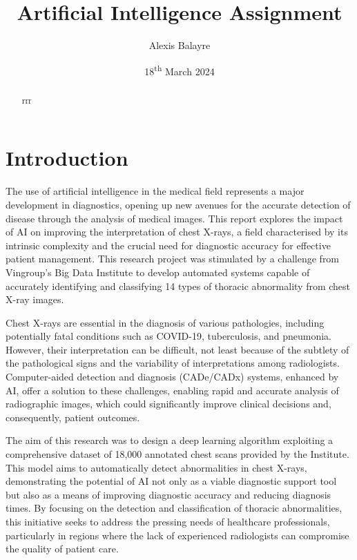 \documentclass[12pt,oneside]{book} %
\title{Artificial Intelligence Assignment}
\author{Alexis Balayre}
\date{18\textsuperscript{th} March 2024}
\begin{document}
\frontmatter

\maketitle

\begin{abstract}

    rrr

\end{abstract}

{
\clearpage
\singlespacing
{
    \tableofcontents
}
\clearpage

\listoffigures

\listoftables
}

\mainmatter
\pagestyle{fancy}
\fancyhead[L]{\nouppercase{\leftmark}}
\fancyhead[R]{\nouppercase{\rightmark}}

\chapter{Introduction}
The use of artificial intelligence in the medical field represents a major
development in diagnostics, opening up new avenues for the accurate detection
of disease through the analysis of medical images. This report explores the
impact of AI on improving the interpretation of chest X-rays, a field
characterised by its intrinsic complexity and the crucial need for diagnostic
accuracy for effective patient management. This research project was stimulated
by a challenge from Vingroup's Big Data Institute to develop automated systems
capable of accurately identifying and classifying 14 types of thoracic
abnormality from chest X-ray images.

Chest X-rays are essential in the diagnosis of various pathologies, including
potentially fatal conditions such as COVID-19, tuberculosis, and pneumonia.
However, their interpretation can be difficult, not least because of the
subtlety of the pathological signs and the variability of interpretations among
radiologists. Computer-aided detection and diagnosis (CADe/CADx) systems,
enhanced by AI, offer a solution to these challenges, enabling rapid and
accurate analysis of radiographic images, which could significantly improve
clinical decisions and, consequently, patient outcomes.

The aim of this research was to design a deep learning algorithm exploiting a
comprehensive dataset of 18,000 annotated chest scans provided by the
Institute. This model aims to automatically detect abnormalities in chest
X-rays, demonstrating the potential of AI not only as a viable diagnostic
support tool but also as a means of improving diagnostic accuracy and reducing
diagnosis times. By focusing on the detection and classification of thoracic
abnormalities, this initiative seeks to address the pressing needs of
healthcare professionals, particularly in regions where the lack of experienced
radiologists can compromise the quality of patient care.
\end{document}
